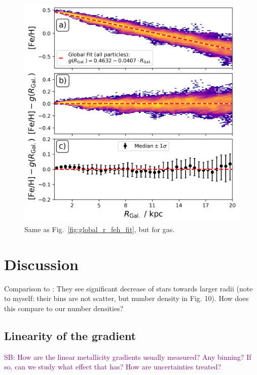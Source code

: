 \documentclass[fleqn,usenatbib]{mnras}
\newcommand{\SB}[1]{{\textcolor{purple}{SB: #1}}}
\begin{document}
\begin{figure}
    \centering
    \includegraphics[width=\columnwidth]{figures/global_r_feh_fit_gas.png}
    \caption{Same as Fig.~\ref{fig:global_r_feh_fit}, but for gas.}
    \label{fig:global_r_feh_fit_gas}
\end{figure}

\section{Discussion} \label{sec:discussion}

Comparison to \citet[][see their Fig. 10]{Minchev2014b}: They see significant decrease of stars towards larger radii (note to myself: their bins are not scatter, but number density in Fig. 10). How does this compare to our number densities?

\subsection{Linearity of the gradient} \label{sec:discussion_linearity}

\SB{How are the linear metallicity gradients usually measured? Any binning? If so, can we study what effect that has? How are uncertainties treated?}
\end{document}
